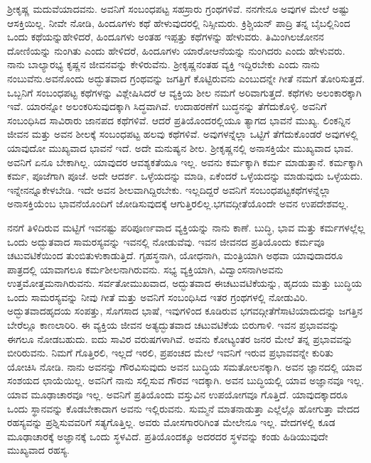 ಶ‍್ರೀಕೃಷ್ಣ ಮದುವೆಯಾದವನು. ಅವನಿಗೆ ಸಂಬಂಧಪಟ್ಟ ಸಹಸ್ರಾರು ಗ್ರಂಥಗಳಿವೆ. ನನಗೇನೂ ಅವುಗಳ ಮೇಲೆ ಅಷ್ಟು ಆಸಕ್ತಿಯಿಲ್ಲ. ನೀವೇ ನೋಡಿ, ಹಿಂದೂಗಳು ಕಥೆ ಹೇಳುವುದರಲ್ಲಿ ನಿಸ್ಸೀಮರು. ಕ್ರಿಶ್ಚಿಯನ್​ ಪಾದ್ರಿ ತನ್ನ ಬೈಬಲ್ಲಿನಿಂದ ಒಂದು ಕಥೆಯನ್ನು\break ಹೇಳಿದರೆ, ಹಿಂದೂಗಳು ಅಂತಹ ಇಪ್ಪತ್ತು ಕಥೆಗಳನ್ನು ಹೇಳುವರು. ತಿಮಿಂಗಿಲ\break ಜೋನನ ದೋಣಿಯನ್ನು ನುಂಗಿತು ಎಂದು ಹೇಳಿದರೆ, ಹಿಂದೂಗಳು ಯಾರೋ\break ಆನೆಯನ್ನು ನುಂಗಿದರು ಎಂದು ಹೇಳುವರು. ನಾನು ಬಾಲ್ಯಾರಭ್ಯ ಕೃಷ್ಣನ ಜೀವನವನ್ನು ಕೇಳಿರುವೆನು. ಶ‍್ರೀಕೃಷ್ಣನಂತಹ ವ್ಯಕ್ತಿ ಇದ್ದಿರಬೇಕು ಎಂದು ನಾನು ನಂಬುವೆನು.\break ಅವನೊಂದು ಅದ್ಭುತವಾದ ಗ್ರಂಥವನ್ನು ಜಗತ್ತಿಗೆ ಕೊಟ್ಟಿರುವನು ಎಂಬುದನ್ನೇ ಗೀತೆ ನಮಗೆ ತೋರಿಸುತ್ತದೆ. ಒಬ್ಬನಿಗೆ ಸಂಬಂಧಪಟ್ಟ ಕಥೆಗಳನ್ನು ವಿಶ್ಲೇಷಿಸಿದರೆ ಆ ವ್ಯಕ್ತಿಯ ಶೀಲ ನಮಗೆ ಅರಿವಾಗುತ್ತದೆ. ಕಥೆಗಳು ಅಲಂಕಾರಕ್ಕಾಗಿ ಇವೆ. ಯಾರನ್ನೋ ಅಲಂಕರಿಸು\-ವುದಕ್ಕಾಗಿ ಸಿದ್ಧವಾಗಿವೆ. ಉದಾಹರಣೆಗೆ ಬುದ್ಧನನ್ನು ತೆಗೆದುಕೊಳ್ಳಿ. ಅವನಿಗೆ ಸಂಬಂಧಿಸಿದ ಸಾವಿರಾರು ಜಾನಪದ ಕಥೆಗಳಿವೆ. ಆದರೆ ಪ್ರತಿಯೊಂದರಲ್ಲಿಯೂ ತ್ಯಾಗದ ಭಾವನೆ ಮುಖ್ಯ. ಲಿಂಕನ್ನಿನ ಜೀವನ ಮತ್ತು ಅವನ ಶೀಲಕ್ಕೆ ಸಂಬಂಧಪಟ್ಟ ಹಲವು ಕಥೆಗಳಿವೆ. ಅವುಗಳನ್ನೆಲ್ಲಾ ಒಟ್ಟಿಗೆ ತೆಗೆದುಕೊಂಡರೆ ಅವುಗಳಲ್ಲಿ ಯಾವುದೋ ಮುಖ್ಯವಾದ ಭಾವನೆ ಇದೆ. ಅದೇ ಮನುಷ್ಯನ ಶೀಲ. ಶ‍್ರೀಕೃಷ್ಣನಲ್ಲಿ ಅನಾಸಕ್ತಿಯೇ ಮುಖ್ಯವಾದ ಭಾವ. ಅವನಿಗೆ ಏನೂ ಬೇಕಾಗಿಲ್ಲ. ಯಾವುದರ ಆವಶ್ಯಕತೆಯೂ ಇಲ್ಲ. ಅವನು ಕರ್ಮಕ್ಕಾಗಿ ಕರ್ಮ ಮಾಡುತ್ತಾನೆ. ಕರ್ಮಕ್ಕಾಗಿ ಕರ್ಮ, ಪೂಜೆಗಾಗಿ ಪೂಜೆ. ಅದೇ ಆದರ್ಶ. ಒಳ್ಳೆಯದನ್ನು ಮಾಡಿ, ಏಕೆಂದರೆ ಒಳ್ಳೆಯದನ್ನು ಮಾಡುವುದು ಒಳ್ಳೆಯದು. ಇನ್ನೇನನ್ನೂ\break ಕೇಳಬೇಡಿ. ಇದೇ ಅವನ ಶೀಲವಾಗಿದ್ದಿರಬೇಕು. ಇಲ್ಲದಿದ್ದರೆ ಅವನಿಗೆ ಸಂಬಂಧಪಟ್ಟ\break ಕಥೆಗಳನ್ನೆಲ್ಲಾ ಅನಾಸಕ್ತಿಯೆಂಬ ಭಾವನೆಯೊಂದಿಗೆ ಜೋಡಿಸುವುದಕ್ಕೆ ಆಗುತ್ತಿರಲಿಲ್ಲ.\break ಭಗವದ್ಗೀತೆಯೊಂದೇ ಅವನ ಉಪದೇಶವಲ್ಲ.

ನನಗೆ ತಿಳಿದಿರುವ ಮಟ್ಟಿಗೆ ಇವನಷ್ಟು ಪರಿಪೂರ್ಣವಾದ ವ್ಯಕ್ತಿಯನ್ನು ನಾನು ಕಾಣೆ. ಬುದ್ಧಿ, ಭಾವ ಮತ್ತು ಕರ್ಮಗಳಲ್ಲೆಲ್ಲ ಒಂದು ಅದ್ಭುತವಾದ ಸಾಮರಸ್ಯವನ್ನು ಇವನಲ್ಲಿ ನೋಡುವೆವು. ಇವನ ಜೀವನದ ಪ್ರತಿಯೊಂದು ಕರ್ಮವೂ ಚಟುವಟಿಕೆಯಿಂದ ತುಂಬಿ\break ತುಳುಕಾಡುತ್ತಿದೆ. ಗೃಹಸ್ಥನಾಗಿ, ಯೋಧನಾಗಿ, ಮಂತ್ರಿಯಾಗಿ ಅಥವಾ ಯಾವುದಾದರೂ ಪಾತ್ರದಲ್ಲಿ ಯಾವಾಗಲೂ ಕರ್ಮಶೀಲನಾಗಿರುವನು. ಸಭ್ಯ ವ್ಯಕ್ತಿಯಾಗಿ, ವಿದ್ವಾಂಸನಾಗಿ\break ಅವನು ಉತ್ತಮೋತ್ತಮನಾಗಿರುವನು. ಸರ್ವತೋಮುಖವಾದ, ಅದ್ಭುತವಾದ ಈ\break ಚಟುವಟಿಕೆಯನ್ನು, ಹೃದಯ ಮತ್ತು ಬುದ್ಧಿಯ ಒಂದು ಸಾಮರಸ್ಯವನ್ನು ನೀವು ಗೀತೆ ಮತ್ತು ಅವನಿಗೆ ಸಂಬಂಧಿಸಿದ ಇತರ ಗ್ರಂಥಗಳಲ್ಲಿ ನೋಡುವಿರಿ. ಅದ್ಭುತವಾದ\break ಹೃದಯ ಸಂಪತ್ತು, ಸೊಗಸಾದ ಭಾಷೆ, ಇವುಗಳಿಂದ ಕೂಡಿರುವ ಭಗವದ್ಗೀತೆಗೆ\break ಸಾಟಿಯಾದುದನ್ನು ಜಗತ್ತಿನ ಬೇರೆಲ್ಲೂ ಕಾಣಲಾರಿರಿ. ಈ ವ್ಯಕ್ತಿಯ ಜೀವನ ಅತ್ಯದ್ಭುತವಾದ ಚಟುವಟಿಕೆಯ ಬಿರುಗಾಳಿ. ಇವನ ಪ್ರಭಾವವನ್ನು ಈಗಲೂ ನೋಡಬಹುದು. ಐದು ಸಾವಿರ ವರುಷಗಳಾಗಿವೆ. ಅವನು ಕೋಟ್ಯಂತರ ಜನರ ಮೇಲೆ ತನ್ನ ಪ್ರಭಾವವನ್ನು ಬೀರಿರುವನು. ನಿಮಗೆ ಗೊತ್ತಿರಲಿ, ಇಲ್ಲದೆ ಇರಲಿ, ಪ್ರಪಂಚದ ಮೇಲೆ ಇವನಿಗೆ ಇರುವ ಪ್ರಭಾವವನ್ನೇ ಕುರಿತು ಯೋಚಿಸಿ ನೋಡಿ. ನಾನು ಅವನನ್ನು ಗೌರವಿಸುವುದು ಅವನ ಬುದ್ಧಿಯ ಸಮತೋಲನಕ್ಕಾಗಿ. ಅವನ ಜ್ಞಾನದಲ್ಲಿ ಯಾವ ಸಂಶಯದ ಛಾಯೆಯಿಲ್ಲ. ಅವನಿಗೆ ನಾನು ಸಲ್ಲಿಸುವ ಗೌರವ ಇದಕ್ಕಾಗಿ. ಅವನ ಬುದ್ಧಿಯಲ್ಲಿ ಯಾವ ಅಜ್ಞಾನವೂ ಇಲ್ಲ. ಯಾವ ಮೂಢಾಚಾರವೂ ಇಲ್ಲ. ಅವನಿಗೆ ಪ್ರತಿಯೊಂದು ವಸ್ತುವಿನ ಉಪಯೋಗವೂ ಗೊತ್ತಿದೆ. ಯಾವುದಕ್ಕಾದರೂ ಒಂದು ಸ್ಥಾನವನ್ನು ಕೊಡಬೇಕಾದಾಗ ಅವನು ಇಲ್ಲಿರುವನು. ಸುಮ್ಮನೆ ಮಾತನಾಡುತ್ತಾ ಎಲ್ಲೆಲ್ಲೊ ಹೋಗುತ್ತಾ ವೇದದ ರಹಸ್ಯವನ್ನು ಪ್ರಶ್ನಿಸುವವರಿಗೆ ಸತ್ಯಗೊತ್ತಿಲ್ಲ. ಅವರು ಮೋಸಗಾರರಿಗಿಂತ ಮೇಲೇನೂ ಇಲ್ಲ. ವೇದಗಳಲ್ಲಿ ಕೂಡ ಮೂಢಾಚಾರಕ್ಕೆ ಅಜ್ಞಾನಕ್ಕೆ ಒಂದು ಸ್ಥಳವಿದೆ. ಪ್ರತಿಯೊಂದಕ್ಕೂ ಅದರದರ ಸ್ಥಳವನ್ನು ಕಂಡು ಹಿಡಿಯುವುದೇ ಮುಖ್ಯವಾದ ರಹಸ್ಯ.

